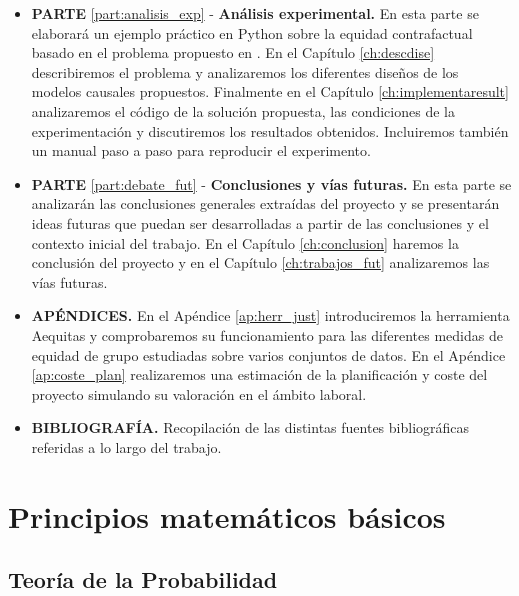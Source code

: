 \documentclass[oneside,openright,titlepage,numbers=noenddot,openany,headinclude,footinclude=true,
cleardoublepage=empty,abstractoff,BCOR=5mm,paper=a4,fontsize=12pt,main=spanish]{scrreprt}
\begin{document}
\begin{itemize}
    \item \textbf{PARTE} \ref{part:analisis_exp} - \textbf{Análisis experimental.} En esta parte se elaborará un ejemplo práctico en Python sobre la equidad contrafactual basado en el problema propuesto en \cite{counterfactual2018}. En el Capítulo \ref{ch:descdise} describiremos el problema y analizaremos los diferentes diseños de los modelos causales propuestos. Finalmente en el Capítulo \ref{ch:implementaresult} analizaremos el código de la solución propuesta, las condiciones de la experimentación y discutiremos los resultados obtenidos. Incluiremos también un manual paso a paso para reproducir el experimento.\\
    \item \textbf{PARTE} \ref{part:debate_fut} - \textbf{Conclusiones y vías futuras.} En esta parte se analizarán las conclusiones generales extraídas del proyecto y se presentarán ideas futuras que puedan ser desarrolladas a partir de las conclusiones y el contexto inicial del trabajo. En el Capítulo \ref{ch:conclusion} haremos la conclusión del proyecto y en el Capítulo \ref{ch:trabajos_fut} analizaremos las vías futuras.\\
    \item \textbf{APÉNDICES.} En el Apéndice \ref{ap:herr_just} introduciremos la herramienta Aequitas y comprobaremos su funcionamiento para las diferentes medidas de equidad de grupo estudiadas sobre varios conjuntos de datos. En el Apéndice \ref{ap:coste_plan} realizaremos una estimación de la planificación y coste del proyecto simulando su valoración en el ámbito laboral.\\
    \item \textbf{BIBLIOGRAFÍA.} Recopilación de las distintas fuentes bibliográficas referidas a lo largo del trabajo.
\end{itemize}

\part{Principios matemáticos básicos} \label{part:princbasic}

\chapter{Teoría de la Probabilidad} \label{ch:teoriaprob}
\end{document}
